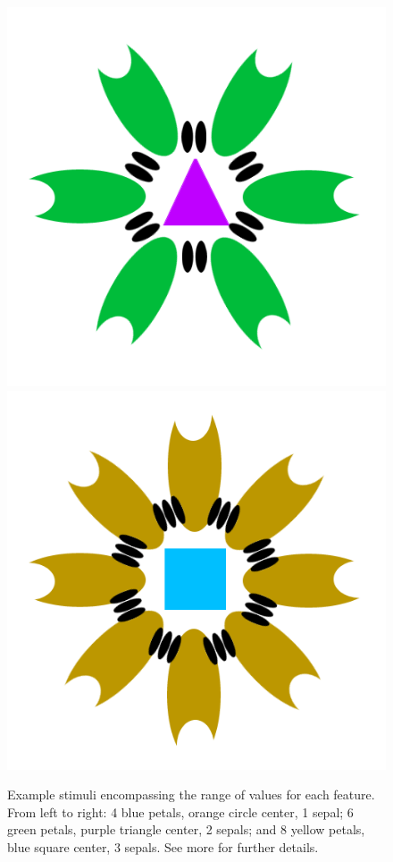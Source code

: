 \documentclass[twocolumn]{svjour3}          %
\begin{document}
\begin{figure}
  \includegraphics[scale=0.15]{flower2.png}
  \includegraphics[scale=0.15]{flower3.png}
  \caption{Example stimuli encompassing the range of values for each
    feature.  From left to right: 4 blue petals, orange circle center,
    1 sepal; 6 green petals, purple triangle center, 2 sepals; and 8
    yellow petals, blue square center, 3 sepals. See more
    \citet{DeBrigard2017} for further details.}
  \label{fig:flowers}
\end{figure}
\end{document}
